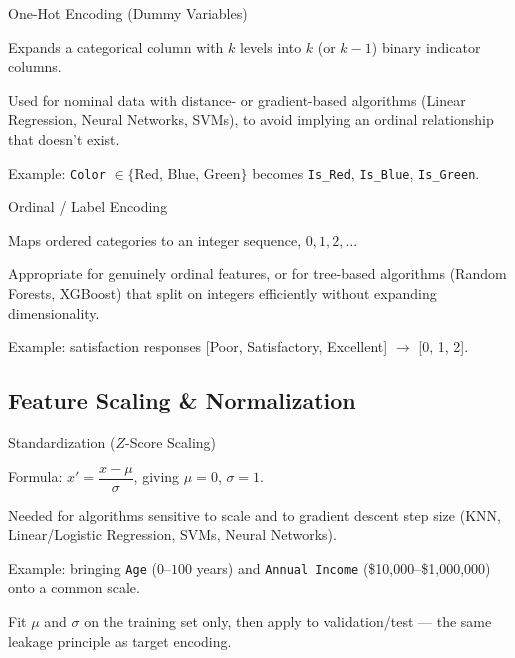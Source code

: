 \begin{frame}{One-Hot Encoding (Dummy Variables)}
    \begin{sitemize}
        \item Expands a categorical column with $k$ levels into $k$ (or $k-1$) binary indicator columns.
        \item Used for nominal data with distance- or gradient-based algorithms (Linear Regression, Neural Networks, SVMs), to avoid implying an ordinal relationship that doesn't exist.
        \item Example: \texttt{Color} $\in \{$Red, Blue, Green$\}$ becomes \texttt{Is\_Red}, \texttt{Is\_Blue}, \texttt{Is\_Green}.
    \end{sitemize}
\end{frame}


\begin{frame}{Ordinal / Label Encoding}
    \begin{sitemize}
        \item Maps ordered categories to an integer sequence, $0, 1, 2, \dots$
        \item Appropriate for genuinely ordinal features, or for tree-based algorithms (Random Forests, XGBoost) that split on integers efficiently without expanding dimensionality.
        \item Example: satisfaction responses [Poor, Satisfactory, Excellent] $\to$ [0, 1, 2].
    \end{sitemize}
\end{frame}


\subsection{Feature Scaling \& Normalization}


\begin{frame}{Standardization ($Z$-Score Scaling)}
    \begin{sitemize}
        \item Formula: $x' = \dfrac{x - \mu}{\sigma}$, giving $\mu = 0$, $\sigma = 1$.
        \item Needed for algorithms sensitive to scale and to gradient descent step size (KNN, Linear/Logistic Regression, SVMs, Neural Networks).
        \item Example: bringing \texttt{Age} ($0$--$100$ years) and \texttt{Annual Income} (\$10,000--\$1,000,000) onto a common scale.
        \item Fit $\mu$ and $\sigma$ on the training set only, then apply to validation/test — the same leakage principle as target encoding.
    \end{sitemize}
\end{frame}


